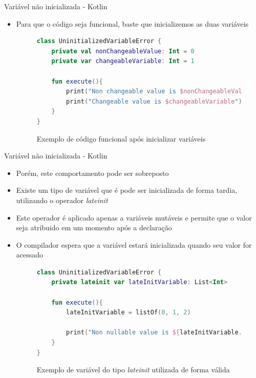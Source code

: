 \documentclass[brazilian]{beamer}
\begin{document}
\begin{frame}[fragile]{Variável não inicializada - Kotlin}
    \begin{itemize}
        \item Para que o código seja funcional, baste que inicializemos as duas variáveis
        \begin{figure}[H]
            \centering
            \begin{lstlisting}[language=kotlin]
class UninitializedVariableError {
    private val nonChangeableValue: Int = 0
    private var changeableVariable: Int = 1

    fun execute(){
        print("Non changeable value is $nonChangeableValue")
        print("Changeable value is $changeableVariable")
    }
}
            \end{lstlisting}
            \caption{Exemplo de código funcional após inicializar variáveis}
            \label{fig:kotlin_init_variable}
        \end{figure}
    \end{itemize}
\end{frame}

\begin{frame}[fragile]{Variável não inicializada - Kotlin}
    \begin{itemize}
        \item Porém, este comportamento pode ser sobreposto
        \item Existe um tipo de variável que é pode ser inicializada de forma tardia, utilizando o operador \emph{lateinit}
        \item Este operador é aplicado apenas a variáveis mutáveis e permite que o valor seja atribuido em um momento após a declaração
        \item O compilador espera que a variável estará inicializada quando seu valor for acessado
        \begin{figure}[H]
            \centering
            \begin{lstlisting}[language=Kotlin]
class UninitializedVariableError {
    private lateinit var lateInitVariable: List<Int>

    fun execute(){
        lateInitVariable = listOf(0, 1, 2)
        
        print("Non nullable value is ${lateInitVariable.first()}")
    }
}
            \end{lstlisting}
            \caption{Exemplo de variável do tipo \textit{lateinit} utilizada de forma válida}
            \label{fig:kotlin_lateinit_variable_initialized}
        \end{figure}
    \end{itemize}
\end{frame}
\end{document}
